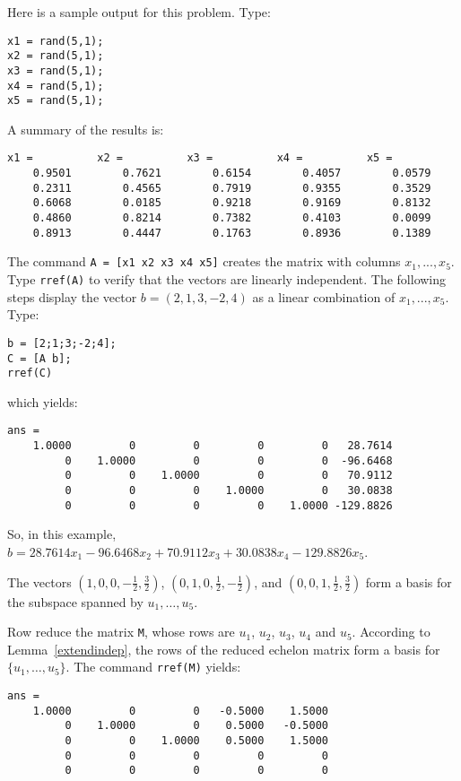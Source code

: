 \documentclass{ximera}
\begin{document}
Here is a sample \Matlab output for this problem.  Type:
\begin{verbatim}
x1 = rand(5,1);
x2 = rand(5,1);
x3 = rand(5,1);
x4 = rand(5,1);
x5 = rand(5,1);
\end{verbatim}
A summary of the results is:
\begin{verbatim}
x1 =          x2 =          x3 =          x4 =          x5 =
    0.9501        0.7621        0.6154        0.4057        0.0579
    0.2311        0.4565        0.7919        0.9355        0.3529
    0.6068        0.0185        0.9218        0.9169        0.8132
    0.4860        0.8214        0.7382        0.4103        0.0099
    0.8913        0.4447        0.1763        0.8936        0.1389
\end{verbatim}
The command {\tt A = [x1 x2 x3 x4 x5]} creates the matrix with columns
$x_1,...,x_5$.  Type {\tt rref(A)} to verify that the vectors are
linearly independent.  The following steps display the vector
$b = (2,1,3,-2,4)$ as a linear combination of $x_1,...,x_5$.  Type:
\begin{verbatim}
b = [2;1;3;-2;4];
C = [A b];
rref(C)
\end{verbatim}
which yields:
\newpage
\begin{verbatim}
ans =
    1.0000         0         0         0         0   28.7614
         0    1.0000         0         0         0  -96.6468
         0         0    1.0000         0         0   70.9112
         0         0         0    1.0000         0   30.0838
         0         0         0         0    1.0000 -129.8826
\end{verbatim}
So, in this example, $b = 28.7614x_1 - 96.6468x_2 + 70.9112x_3
+ 30.0838x_4 - 129.8826x_5$.

\ans The vectors $(1,0,0,-\frac{1}{2},\frac{3}{2})$, $(0,1,0,\frac{1}{2},
-\frac{1}{2})$, and $(0,0,1,\frac{1}{2},\frac{3}{2})$ form a basis
for the subspace spanned by $u_1, \dots ,u_5$.

\soln Row reduce the matrix {\tt M}, whose
rows are $u_1$, $u_2$, $u_3$, $u_4$ and $u_5$.  According to 
Lemma~\ref{extendindep}, the rows of the
reduced echelon matrix form a basis for $\{u_1,\dots ,u_5\}$.  The
command {\tt rref(M)} yields:
\begin{verbatim}
ans =
    1.0000         0         0   -0.5000    1.5000
         0    1.0000         0    0.5000   -0.5000
         0         0    1.0000    0.5000    1.5000
         0         0         0         0         0
         0         0         0         0         0
\end{verbatim}
\end{document}
